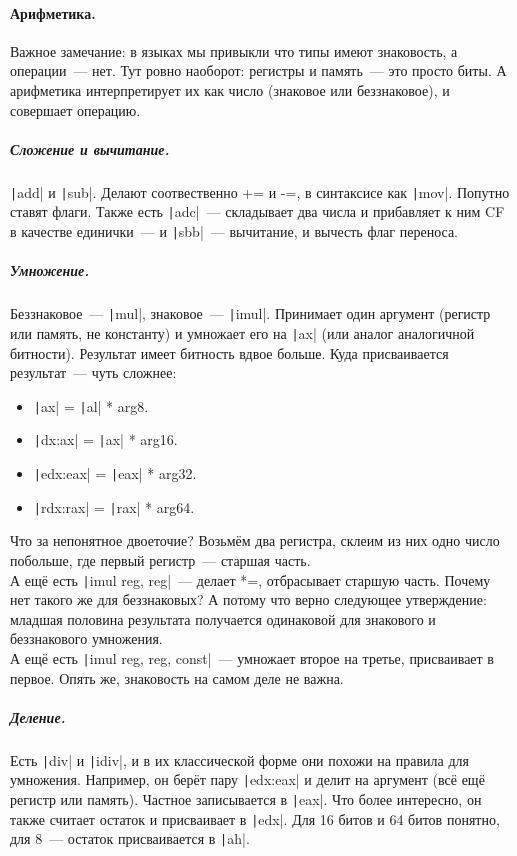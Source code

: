 \documentclass{article}
\begin{document}
    \paragraph{Арифметика.}
    Важное замечание: в языках мы привыкли что типы имеют знаковость, а операции~--- нет. Тут ровно наоборот: регистры и память~--- это просто биты. А арифметика интерпретирует их как число (знаковое или беззнаковое), и совершает операцию.
    \subparagraph{Сложение и вычитание.}
    \texttt|add| и \texttt|sub|. Делают соотвественно += и -=, в синтаксисе как \texttt|mov|. Попутно ставят флаги. Также есть \texttt|adc|~--- складывает два числа и прибавляет к ним CF в качестве единички~--- и \texttt|sbb|~--- вычитание, и вычесть флаг переноса.
    \subparagraph{Умножение.}
    Беззнаковое~--- \texttt|mul|, знаковое~--- \texttt|imul|. Принимает один аргумент (регистр или память, не константу) и умножает его на \texttt|ax| (или аналог аналогичной битности). Результат имеет битность вдвое больше. Куда присваивается результат~--- чуть сложнее:
    \begin{itemize}
        \item \texttt|ax| = \texttt|al| * arg8.
        \item \texttt|dx:ax| = \texttt|ax| * arg16.
        \item \texttt|edx:eax| = \texttt|eax| * arg32.
        \item \texttt|rdx:rax| = \texttt|rax| * arg64.
    \end{itemize}
    Что за непонятное двоеточие? Возьмём два регистра, склеим из них одно число побольше, где первый регистр~--- старшая часть.\\
    А ещё есть \texttt|imul reg, reg|~--- делает *=, отбрасывает старшую часть. Почему нет такого же для беззнаковых? А потому что верно следующее утверждение: младшая половина результата получается одинаковой для знакового и беззнакового умножения.\\
    А ещё есть \texttt|imul reg, reg, const|~--- умножает второе на третье, присваивает в первое. Опять же, знаковость на самом деле не важна.
    \subparagraph{Деление.}
    Есть \texttt|div| и \texttt|idiv|, и в их классической форме они похожи на правила для умножения. Например, он берёт пару \texttt|edx:eax| и делит на аргумент (всё ещё регистр или память). Частное записывается в \texttt|eax|. Что более интересно, он также считает остаток и присваивает в \texttt|edx|. Для 16 битов и 64 битов понятно, для 8~--- остаток присваивается в \texttt|ah|.\\
\end{document}
